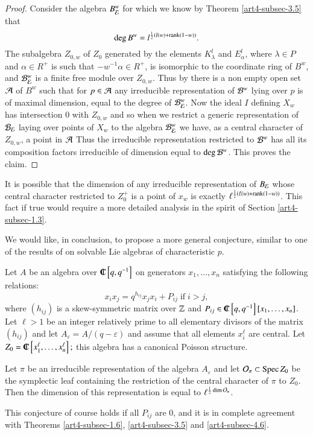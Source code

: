 \begin{proof}
Consider the algebra $B_{\mathcal{E}}^{w}$ for which we know by Theorem \ref{art4-subsec-3.5} that
$$
\deg B^{w} = l^{\frac{1}{2}(l(w)+\operatorname{rank}(1-w))}.
$$
The subalgebra $Z_{0, w}$ of $Z_{0}$ generated by the elements $K_{\lambda}^{l}$ and $E_{\alpha}^{l}$, where $\lambda \in P$ and $\alpha \in R^{+}$ is such that $-w^{-1}\alpha \in R^{+}$, is isomorphic to the coordinate ring of $B^{w}$, and $\mathcal{B}_{\mathcal{E}}^{w}$ is a finite free module over $Z_{0, w}$. Thus by \cite{art4-keyDKP2} there is a non empty open set $\mathcal{A}$ of $B^{w}$ such that for  $p\in \mathcal{A}$ any irreducible representation of $\mathcal{B}^{w}$ lying over $p$ is of maximal dimension, equal to the degree of $\mathcal{B}_{\mathcal{E}}^{w}$. Now the ideal $I$ defining $X_{w}$ has intersection $0$ with $Z_{0, w}$ and so when we restrict a generic representation of $\mathcal{B}_{\mathcal{E}}$ laying over points of $X_{w}$ to the algebra $\mathcal{B}_{\mathcal{E}}^{w}$ we have, as a central character of $Z_{0, w}$, a point in $\mathcal{A}$ Thus the irreducible representation restricted to $\mathcal{B}^{w}$ has all its composition factors irreducible of dimension equal to $\deg\mathcal{B}^{w}$. This proves the claim.  
\end{proof}

It is possible that the dimension of any irreducible representation of $B_{\mathcal{E}}$ whose central character restricted to $Z_{0}^{+}$ is  a point of $x_{w}$ is exactly $\ell^{\frac{1}{2}(\ell(w)+\operatorname{rank}(1-w))}$. This fact if true would require a more detailed analysis in the spirit of Section \ref{art4-subsec-1.3}.

We would like, in conclusion, to propose a more general conjecture, similar to one of the results of \cite{art4-keyWK} on solvable Lie algebras of characteristic $p$.

Let $A$ be an algebra over ${\IC}\left[q, q^{-1}\right]$ on generators $x_{1}, \ldots, x_{n}$ satisfying the following relations:
$$
x_{i}x_{j}= q^{h_{ij}}x_{j}x_{i}+ P_{ij}\; \text{if} \; i > j,
$$
where $(h_{ij})$ is a skew-symmetric matrix over $\mathbb{Z}$ and $P_{ij}\in \IC\left[q, q^{-1}\right]\break\left[x_{1}, \ldots, x_{n}\right]$. Let $\ell > 1$ be an integer relatively prime to all elementary divisors of the matrix $(h_{ij})$ and let $A_{\varepsilon} = A/(q -\varepsilon)$ and assume that all elements $x_{i}^{\ell}$ are central. Let $Z_{0} = \IC\left[x_{1}^{\ell}, \ldots, x_{n}^{\ell}\right];$ this algebra has a canonical Poisson structure.

\begin{conjecture*}
Let $\pi$ be an irreducible representation of the algebra $A_{\varepsilon}$ and let $\mathcal{O}_{\pi} \subset \operatorname{Spec} Z_{0}$ be the symplectic leaf containing the restriction of the central character of $\pi$ to $Z_{0}$. Then the dimension of this representation is equal to $\ell^{\frac{1}{2}\dim \mathcal{O}_{\pi}}$.

This conjecture of course holds if all $P_{ij}$ are 0, and it is in complete agreement with Theorems \ref{art4-subsec-1.6}, \ref{art4-subsec-3.5} and \ref{art4-subsec-4.6}.
\end{conjecture*}

